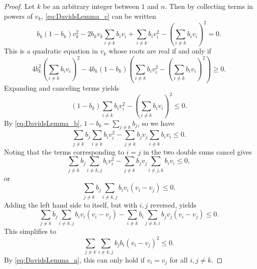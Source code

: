 \begin{proof}
    Let \( k \) be an arbitrary integer between \( 1 \) and \( n \). Then by collecting terms in powers of \( v_k \),
\eqref{eq:DavidsLemma_c} can be written
\begin{equation*}
  b_{k}(1-b_{k})v_{k}^{2} - 2b_{k}v_{k}\sum_{i \neq k}b_{i}v_{i} + \sum_{i \neq k}b_{i}v_{i}^{2} - \left(\sum_{i \neq k}b_{i}v_{i}\right)^{2} = 0.
\end{equation*}
This is a quadratic equation in \( v_{k} \) whose roots are real if and only if
\begin{equation*}
    4b_{k}^{2}\left(\sum_{i \neq k}b_{i}v_{i}\right)^{2} - 4b_{k}(1-b_{k})\left(\sum_{i \neq k}b_{i}v_{i}^{2} - \left(\sum_{i \neq k}b_{i}v_{i}\right)^{2}\right) \geq 0.
\end{equation*}
Expanding and canceling terms yields
\begin{equation*}
    (1-b_{k})\sum_{i \neq k}b_{i}v_{i}^{2} - \left(\sum_{i \neq k}b_{i}v_{i} \right)^{2} \leq 0.
\end{equation*}
By \eqref{eq:DavidsLemma_b}, \( 1-b_{k} = \sum_{j \ne k}b_{j} \), so we have
\begin{equation*}
    \sum_{j \neq k}b_{j}\sum_{i \neq k}b_{i}v_{i}^{2} - \sum_{j \neq k}b_{j}v_{j}\sum_{i \neq k}b_{i}v_{i} \le 0.
\end{equation*}
Noting that the terms corresponding to \( i = j \) in the two double sums cancel gives
\begin{equation*}
    \sum_{j \neq k}b_{j}\sum_{i \neq k,j}b_{i}v_{i}^{2} - \sum_{j \neq k}b_{j}v_{j}\sum_{i \neq j,k}b_{i}v_{i} \leq 0,
\end{equation*}
or
\begin{equation*}
    \sum_{j \neq k}b_{j}\sum_{i \neq k,j}b_{i}v_{i}(v_{i} - v_{j}) \leq 0.
\end{equation*}
Adding the left hand side to itself, but with \( i,j \) reversed, yields
\begin{equation*}
    \sum_{j \neq k}b_{j}\sum_{i \neq k,j}b_{i}v_{i}(v_{i} - v_{j}) - \sum_{i \neq k}b_{i}\sum_{j \neq k,i}b_{j}v_{j}(v_{i} - v_{j}) \leq 0.
\end{equation*}
This simplifies to
\begin{equation*}
    \sum_{j \neq k}\sum_{i \neq k,j}b_{j}b_{i}(v_{i} - v_{j})^{2} \leq 0.
\end{equation*}
By \eqref{eq:DavidsLemma_a}, this can only hold if \( v_{i} = v_{j} \) for all \( i,j \neq k \).
\end{proof}

